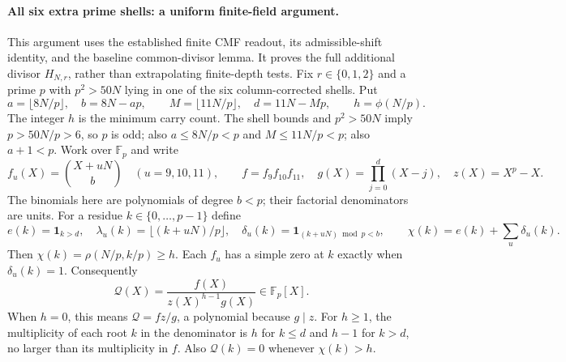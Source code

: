 \documentclass[11pt]{article}
\begin{document}
\paragraph{All six extra prime shells: a uniform finite-field argument.}
This argument uses the established finite CMF readout, its admissible-shift
identity, and the baseline common-divisor lemma. It proves the full
additional divisor $H_{N,r}$, rather than extrapolating finite-depth tests.
Fix $r\in\{0,1,2\}$ and a prime $p$ with $p^2>50N$ lying in one of the
six column-corrected shells. Put
\[
 a=\lfloor8N/p\rfloor,\quad b=8N-ap,\qquad
 M=\lfloor11N/p\rfloor,\quad d=11N-Mp,\qquad h=\phi(N/p).
\]
The integer $h$ is the minimum carry count. The shell bounds and
$p^2>50N$ imply $p>50N/p>6$, so $p$ is odd; also
$a\le8N/p<p$ and $M\le11N/p<p$; also $a+1<p$. Work over $\mathbb F_p$ and
write
\[
 f_u(X)=\binom{X+uN}{b}\quad(u=9,10,11),\qquad
 f= f_9f_{10}f_{11},\quad g(X)=\prod_{j=0}^d(X-j),\quad z(X)=X^p-X.
\]
The binomials here are polynomials of degree $b<p$; their factorial
denominators are units.
For a residue $k\in\{0,\ldots,p-1\}$ define
\[
 e(k)=\mathbf1_{k>d},\quad
 \lambda_u(k)=\lfloor(k+uN)/p\rfloor,\quad
 \delta_u(k)=\mathbf1_{(k+uN)\bmod p<b},\qquad
 \chi(k)=e(k)+\sum_u\delta_u(k).
\]
Then $\chi(k)=\rho(N/p,k/p)\ge h$.
Each $f_u$ has a simple zero at $k$ exactly when $\delta_u(k)=1$.
Consequently
\[
 \mathcal Q(X)=\frac{f(X)}{z(X)^{h-1}g(X)}\in\mathbb F_p[X].
 \tag{Q}
\]
When $h=0$, this means $\mathcal Q=fz/g$, a polynomial because $g\mid z$.
For $h\ge1$, the multiplicity of each root $k$ in the denominator
is $h$ for $k\le d$ and $h-1$ for $k>d$, no larger than its
multiplicity in $f$.
Also $\mathcal Q(k)=0$ whenever $\chi(k)>h$.
\end{document}
